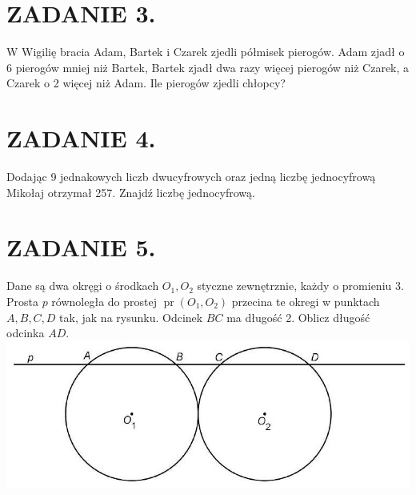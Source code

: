 \documentclass[10pt]{article}
\begin{document}
\section*{ZADANIE 3.}
W Wigilię bracia Adam, Bartek i Czarek zjedli półmisek pierogów. Adam zjadł o 6 pierogów mniej niż Bartek, Bartek zjadł dwa razy więcej pierogów niż Czarek, a Czarek o 2 więcej niż Adam. Ile pierogów zjedli chłopcy?

\section*{ZADANIE 4.}
Dodając 9 jednakowych liczb dwucyfrowych oraz jedną liczbę jednocyfrową Mikołaj otrzymał 257. Znajdź liczbę jednocyfrową.

\section*{ZADANIE 5.}
Dane są dwa okręgi o środkach \(O_{1}, O_{2}\) styczne zewnętrznie, każdy o promieniu 3. Prosta \(p\) równoległa do prostej \(\operatorname{pr}\left(O_{1}, O_{2}\right)\) przecina te okregi w punktach \(A, B, C, D\) tak, jak na rysunku. Odcinek \(B C\) ma długość 2. Oblicz długość odcinka \(A D\).\\
\includegraphics[max width=\textwidth, center]{2024_11_21_a81a4da0f1de819f5471g-1(1)}
\end{document}
